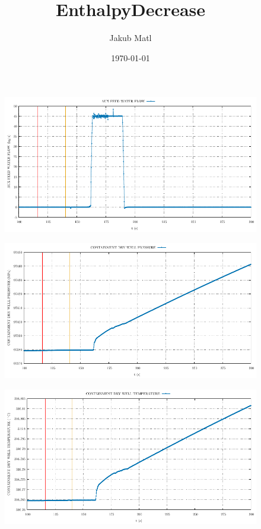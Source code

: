\documentclass{article}
\title{EnthalpyDecrease}
\author{Jakub Matl}
\date{\today}
\begin{document}
\maketitle
\begin{multicols}{2}
\begin{figure}[H]
\centering
\includegraphics[width=\linewidth]{./graphs/AUX FEED WATER FLOW_comp.pdf}
\end{figure}
\begin{figure}[H]
\centering
\includegraphics[width=\linewidth]{./graphs/CONTAINMENT DRY WELL PRESSURE_comp.pdf}
\end{figure}
\begin{figure}[H]
\centering
\includegraphics[width=\linewidth]{./graphs/CONTAINMENT DRY WELL TEMPERATURE_comp.pdf}

\end{figure}
\end{multicols}
\end{document}
